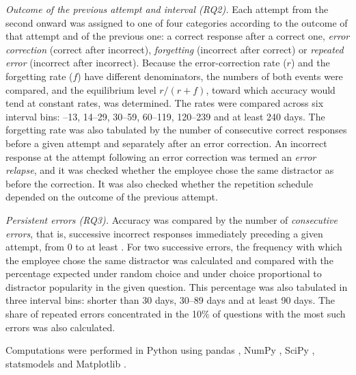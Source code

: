 \emph{Outcome of the previous attempt and interval (RQ2).} Each attempt from the second onward was
assigned to one of four categories according to the outcome of that attempt and of the previous one:
a correct response after a correct one, \emph{error correction} (correct after incorrect),
\emph{forgetting} (incorrect after correct) or \emph{repeated error} (incorrect after incorrect).
Because the error-correction rate ($r$) and the forgetting rate ($f$) have different denominators, the
numbers of both events were compared, and the equilibrium level $r/(r+f)$, toward which accuracy would
tend at constant rates, was determined. The rates were compared across six interval bins:
\MinGapDays--13, 14--29, 30--59, 60--119, 120--239 and at least 240 days. The forgetting rate was also
tabulated by the number of consecutive correct responses before a given attempt and separately after an
error correction. An incorrect response at the attempt following an error correction was termed an
\emph{error relapse}, and it was checked whether the employee chose the same distractor as before the
correction. It was also checked whether the repetition schedule depended on the outcome of the
previous attempt.

\emph{Persistent errors (RQ3).} Accuracy was compared by the number of \emph{consecutive errors}, that
is, successive incorrect responses immediately preceding a given attempt, from 0 to at least \RunMax.
For two successive errors, the frequency with which the employee chose the same distractor was
calculated and compared with the percentage expected under random choice and under choice
proportional to distractor popularity in the given question. This percentage was also tabulated in
three interval bins: shorter than 30 days, 30--89 days and at least 90 days. The share of repeated
errors concentrated in the 10\% of questions with the most such errors was also calculated.

Computations were performed in Python \VerPython{} using pandas \VerPandas, NumPy \VerNumpy, SciPy
\VerScipy, statsmodels \VerStatsmodels{} and Matplotlib \VerMatplotlib.
